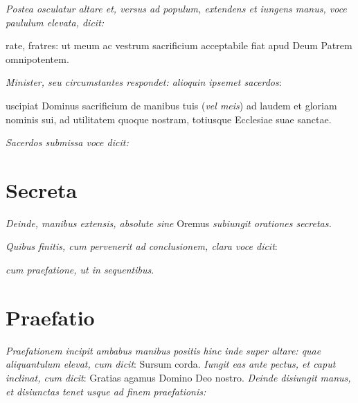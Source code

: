 \textit{%
    Postea osculatur altare et, versus ad populum, extendens et iungens manus,
    voce paululum elevata, dicit:
}

rate, fratres: ut meum ac vestrum sacrificium acceptabile fiat apud
Deum Patrem omnipotentem.

\textit{Minister, seu circumstantes respondet: alioquin ipsemet sacerdos}:

uscipiat Dominus sacrificium de manibus tuis (\textit{vel meis}) ad
laudem et gloriam nominis sui, ad utilitatem quoque nostram, totiusque Ecclesiae
suae sanctae.

\textit{Sacerdos submissa voce dicit:}


\section{Secreta}

\textit{Deinde, manibus extensis, absolute sine} Oremus \textit{subiungit
orationes secretas.}


\textit{Quibus finitis, cum pervenerit ad conclusionem, clara voce dicit}:


\textit{cum praefatione, ut in sequentibus}.

\section{Praefatio}


\textit{Praefationem incipit ambabus manibus positis hinc inde super altare:
quae aliquantulum elevat, cum dicit}: Sursum corda.  \textit{Iungit eas ante
pectus, et caput inclinat, cum dicit}: Gratias agamus Domino Deo nostro.
\textit{Deinde disiungit manus, et disiunctas tenet usque ad finem
praefationis:}


